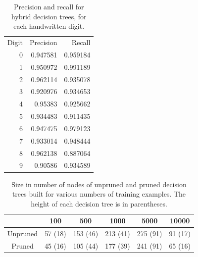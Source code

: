 \begin{table}
	\centering
	\begin{tabular}{rrr}
		\hline
		Digit &   Precision &   Recall \\
		0 &    0.947581 & 0.959184 \\
		1 &    0.950972 & 0.991189 \\
		2 &    0.962114 & 0.935078 \\
		3 &    0.920976 & 0.934653 \\
		4 &    0.95383  & 0.925662 \\
		5 &    0.934483 & 0.911435 \\
		6 &    0.947475 & 0.979123 \\
		7 &    0.933014 & 0.948444 \\
		8 &    0.962138 & 0.887064 \\
		9 &    0.90586  & 0.934589 \\
	\end{tabular}
	\caption{Precision and recall for hybrid decision trees, for each handwritten digit.}
	\label{table:with_kd_precision_recall}
\end{table}

\begin{table}
    \centering
    \begin{tabular}{|c|c|c|c|c|c|}
        \hline
        & 100 & 500 & 1000 & 5000 & 10000 \\
        \hline
        Unpruned & 57 (18) & 153 (46) & 213 (41) & 275 (91) & 91 (17) \\
        \hline
        Pruned  & 45 (16) & 105 (44)  & 177 (39) & 241 (91) & 65 (16) \\
        \hline
    \end{tabular}
    \caption{Size in number of nodes of unpruned and pruned decision trees built for various numbers of training examples. The height of each decision tree is in parentheses.}
    \label{table:dt_sizes}
\end{table}

